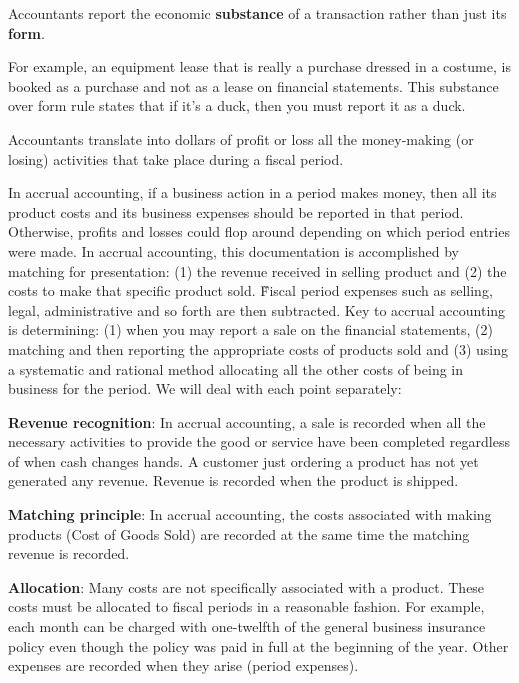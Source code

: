 Accountants report the economic \textbf{substance} of a transaction rather than just its \textbf{form}.
\ed

\be
For example, an equipment lease that is really a purchase dressed in a costume, is booked as a purchase and not as a
lease on financial statements. This substance over form rule states that if it's a duck, then you must report it as a
duck.
\ee

Accountants translate into dollars of profit or loss all the money-making (or losing) activities that take place during
a fiscal period.
\ed

In accrual accounting, if a business action in a period makes money, then all its product costs and its business
expenses should be reported in that period. Otherwise, profits and losses could flop around depending on which period
entries were made. In accrual accounting, this documentation is accomplished by matching for presentation: (1) the
revenue received in selling product and (2) the costs to make that specific product sold. \v

Fiscal period expenses such as selling, legal, administrative and so forth are then subtracted. Key to accrual
accounting is determining: (1) when you may report a sale on the financial statements, (2) matching and then
reporting the appropriate costs of products sold and (3) using a systematic and rational method allocating all the
other costs of being in business for the period. We will deal with each point separately:
\bit
\item \textbf{Revenue recognition}: In accrual accounting, a sale is recorded when all the necessary activities to
provide the good or service have been completed regardless of when cash changes hands. A customer just ordering a
product has not yet generated any revenue. Revenue is recorded when the product is shipped.
\item \textbf{Matching principle}: In accrual accounting, the costs associated with making products (Cost of Goods Sold)
are recorded at the same time the matching revenue is recorded.
\item \textbf{Allocation}: Many costs are not specifically associated with a product. These costs must be allocated to
fiscal periods in a reasonable fashion. For example, each month can be charged with one-twelfth of the general
business insurance policy even though the policy was paid in full at the beginning of the year. Other expenses are
recorded when they arise (period expenses).
\eit

